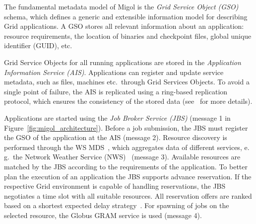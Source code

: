 \documentclass[times, 10pt, twocolumn]{article}
\begin{document}
The fundamental metadata model of Migol is the \emph{Grid Service Object (GSO)} schema,
which defines a generic and extensible information model for
describing Grid applications.  
A GSO stores all relevant information about an application: resource requirements,
the location of binaries and checkpoint files, global unique identifier (GUID),
etc.

Grid Service Objects for all running applications are stored in 
the {\em Application Information Service (AIS)}. 
Applications can register and update service metadata, 
such as files, machines etc.\ through Grid Services Objects. 
To avoid a single point of failure, the AIS is replicated using a ring-based
replication protocol, which ensures  the consistency of the stored data
(see~\cite{Luckow:2008ys} for more details).

Applications are started using the {\em Job Broker Service (JBS)}
(message 1 in Figure~\ref{fig:migol_architecture}). Before a job
submission, the JBS must register the GSO of the application at the
AIS (message 2).  Resource discovery is performed through the WS
MDS~\cite{schopf06}, which aggregates data of different services,
e.\,g.\ the Network Weather Service (NWS)~\cite{NWS99} (message 3).
Available resources are matched by the JBS according to the
requirements of the application. To better plan the execution of an
application the JBS supports advance reservation. If the respective
Grid environment is capable of handling reservations, the JBS
negotiates a time slot with all suitable resources. All reservation
offers are ranked based on a shortest expected delay
strategy~\cite{Jeske:2007wj}.  For spawning of jobs on the selected
resource, the Globus GRAM service is used (message 4).
             
\end{document}
